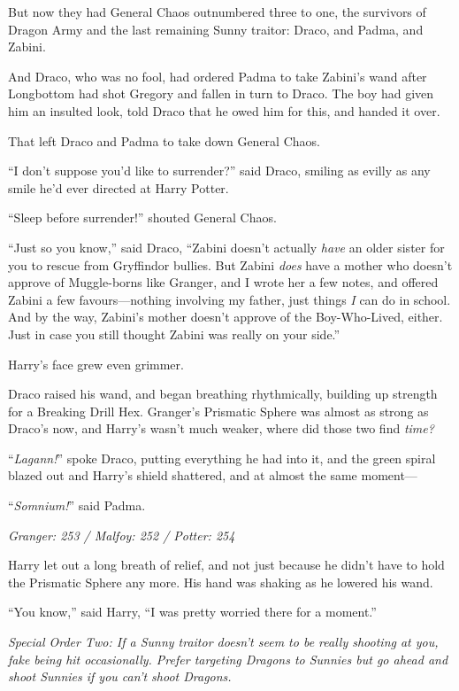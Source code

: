 But now they had General Chaos outnumbered three to one, the survivors of Dragon Army and the last remaining Sunny traitor: Draco, and Padma, and Zabini.

And Draco, who was no fool, had ordered Padma to take Zabini’s wand after Longbottom had shot Gregory and fallen in turn to Draco. The boy had given him an insulted look, told Draco that he owed him for this, and handed it over.

That left Draco and Padma to take down General Chaos.

“I don’t suppose you’d like to surrender?” said Draco, smiling as evilly as any smile he’d ever directed at Harry Potter.

“Sleep before surrender!” shouted General Chaos.

“Just so you know,” said Draco, “Zabini doesn’t actually \emph{have} an older sister for you to rescue from Gryffindor bullies. But Zabini \emph{does} have a mother who doesn’t approve of Muggle-borns like Granger, and I wrote her a few notes, and offered Zabini a few favours—nothing involving my father, just things \emph{I} can do in school. And by the way, Zabini’s mother doesn’t approve of the Boy-Who-Lived, either. Just in case you still thought Zabini was really on your side.”

Harry’s face grew even grimmer.

Draco raised his wand, and began breathing rhythmically, building up strength for a Breaking Drill Hex. Granger’s Prismatic Sphere was almost as strong as Draco’s now, and Harry’s wasn’t much weaker, where did those two find \emph{time?}

“\emph{Lagann!}” spoke Draco, putting everything he had into it, and the green spiral blazed out and Harry’s shield shattered, and at almost the same moment—

“\emph{Somnium!}” said Padma.

\later

\emph{Granger: 253 / Malfoy: 252 / Potter: 254}

Harry let out a long breath of relief, and not just because he didn’t have to hold the Prismatic Sphere any more. His hand was shaking as he lowered his wand.

“You know,” said Harry, “I was pretty worried there for a moment.”

\emph{Special Order Two: If a Sunny traitor doesn’t seem to be really shooting at you, fake being hit occasionally. Prefer targeting Dragons to Sunnies but go ahead and shoot Sunnies if you can’t shoot Dragons.}

